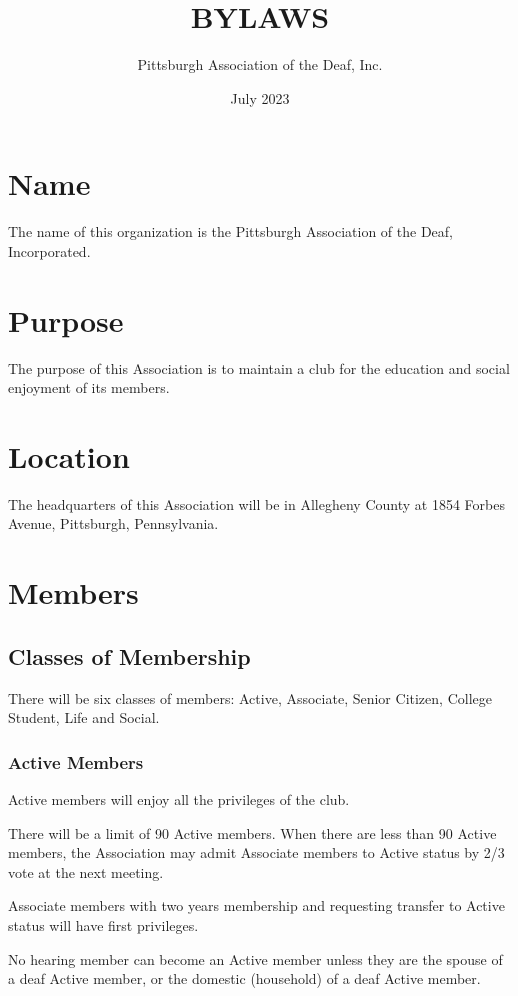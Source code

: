 \documentclass[12pt,letterpaper]{article}
\title{BYLAWS}
\author{Pittsburgh Association of the Deaf, Inc.}
\date{July 2023}
\begin{document}
\maketitle
\newpage
\tableofcontents
\newpage

\section{Name}

The name of this organization is the Pittsburgh Association of the Deaf, Incorporated. 

\section{Purpose}
The purpose of this Association is to maintain a club for the education and social enjoyment of its members. 

\section{Location}
The headquarters of this Association will be in Allegheny County at 1854 Forbes Avenue, Pittsburgh, Pennsylvania.

\section{Members}

\subsection{Classes of Membership}
There will be six classes of members: Active, Associate, Senior Citizen, College Student, Life and Social. 

\subsubsection{Active Members}
Active members will enjoy all the privileges of the club.

There will be a limit of 90 Active members. When there are less than 90 Active members, the Association may admit Associate members to Active status by 2/3 vote at the next meeting.

Associate members with two years membership and requesting transfer to Active status will have first privileges.

No hearing member can become an Active member unless they are the spouse of a deaf Active member, or the domestic (household) of a deaf Active member. 
\end{document}
